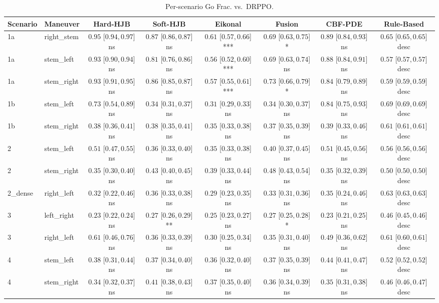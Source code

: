 \begin{table}[ht]
\centering
\caption{Per-scenario Go Frac. vs.\ DRPPO.}
\label{tab:per_scenario_action_go_frac}
\begin{tabular}{llcccccc}
\toprule
Scenario & Maneuver & Hard-HJB & Soft-HJB & Eikonal & Fusion & CBF-PDE & Rule-Based \\
\midrule
1a & right_stem & $0.95$ [$0.94, 0.97$] ns & $0.87$ [$0.86, 0.87$] ns & $0.61$ [$0.57, 0.66$] *** & $0.69$ [$0.63, 0.75$] * & $0.89$ [$0.84, 0.93$] ns & $0.65$ [$0.65, 0.65$] desc \\
1a & stem_left & $0.93$ [$0.90, 0.94$] ns & $0.81$ [$0.76, 0.86$] ns & $0.56$ [$0.52, 0.60$] *** & $0.69$ [$0.63, 0.74$] ns & $0.88$ [$0.84, 0.91$] ns & $0.57$ [$0.57, 0.57$] desc \\
1a & stem_right & $0.93$ [$0.91, 0.95$] ns & $0.86$ [$0.85, 0.87$] ns & $0.57$ [$0.55, 0.61$] *** & $0.73$ [$0.66, 0.79$] * & $0.84$ [$0.79, 0.89$] ns & $0.59$ [$0.59, 0.59$] desc \\
1b & stem_left & $0.73$ [$0.54, 0.89$] ns & $0.34$ [$0.31, 0.37$] ns & $0.31$ [$0.29, 0.33$] ns & $0.34$ [$0.30, 0.37$] ns & $0.84$ [$0.75, 0.93$] ns & $0.69$ [$0.69, 0.69$] desc \\
1b & stem_right & $0.38$ [$0.36, 0.41$] ns & $0.38$ [$0.35, 0.41$] ns & $0.35$ [$0.33, 0.38$] ns & $0.37$ [$0.35, 0.39$] ns & $0.39$ [$0.33, 0.46$] ns & $0.61$ [$0.61, 0.61$] desc \\
2 & stem_left & $0.51$ [$0.47, 0.55$] ns & $0.36$ [$0.33, 0.40$] ns & $0.35$ [$0.33, 0.38$] ns & $0.40$ [$0.37, 0.45$] ns & $0.51$ [$0.45, 0.56$] ns & $0.56$ [$0.56, 0.56$] desc \\
2 & stem_right & $0.35$ [$0.30, 0.40$] ns & $0.43$ [$0.40, 0.45$] ns & $0.39$ [$0.33, 0.44$] ns & $0.48$ [$0.43, 0.54$] ns & $0.35$ [$0.32, 0.39$] ns & $0.50$ [$0.50, 0.50$] desc \\
2_dense & right_left & $0.32$ [$0.22, 0.46$] ns & $0.36$ [$0.33, 0.38$] ns & $0.29$ [$0.23, 0.35$] ns & $0.33$ [$0.31, 0.36$] ns & $0.35$ [$0.24, 0.46$] ns & $0.63$ [$0.63, 0.63$] desc \\
3 & left_right & $0.23$ [$0.22, 0.24$] ns & $0.27$ [$0.26, 0.29$] ** & $0.25$ [$0.23, 0.27$] ns & $0.27$ [$0.25, 0.28$] * & $0.23$ [$0.21, 0.25$] ns & $0.46$ [$0.45, 0.46$] desc \\
3 & right_left & $0.61$ [$0.46, 0.76$] ns & $0.36$ [$0.33, 0.39$] ns & $0.30$ [$0.25, 0.34$] ns & $0.35$ [$0.31, 0.40$] ns & $0.49$ [$0.36, 0.62$] ns & $0.61$ [$0.60, 0.61$] desc \\
4 & stem_left & $0.38$ [$0.31, 0.44$] ns & $0.37$ [$0.34, 0.40$] ns & $0.36$ [$0.32, 0.40$] ns & $0.37$ [$0.35, 0.39$] ns & $0.44$ [$0.41, 0.47$] ns & $0.52$ [$0.52, 0.52$] desc \\
4 & stem_right & $0.34$ [$0.32, 0.37$] ns & $0.41$ [$0.38, 0.43$] ns & $0.37$ [$0.35, 0.40$] ns & $0.36$ [$0.34, 0.39$] ns & $0.35$ [$0.31, 0.38$] ns & $0.46$ [$0.46, 0.47$] desc \\
\bottomrule
\end{tabular}
\end{table}
